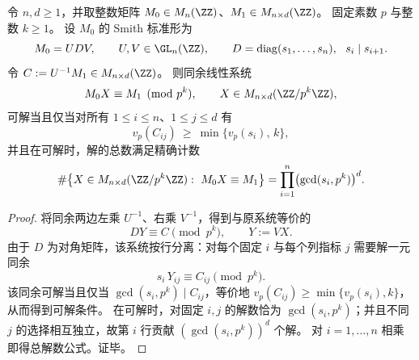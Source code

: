 





\begin{proposition}\label{prop:xi-smith-pk-congruence-solvability-count}
令 \(n,d\ge 1\)，并取整数矩阵 \(M_0\in M_n(\ZZ)\)、\(M_1\in M_{n\times d}(\ZZ)\)。
固定素数 \(p\) 与整数 \(k\ge 1\)。
设 \(M_0\) 的 Smith 标准形为
\[
M_0=UDV,\qquad U,V\in \GL_n(\ZZ),\qquad
D=\mathrm{diag}(s_1,\dots,s_n),\ \ s_i\mid s_{i+1}.
\]
令 \(C:=U^{-1}M_1\in M_{n\times d}(\ZZ)\)。
则同余线性系统
\[
M_0X\equiv M_1\pmod{p^k},\qquad X\in M_{n\times d}(\ZZ/p^k\ZZ),
\]
可解当且仅当对所有 \(1\le i\le n\)、\(1\le j\le d\) 有
\[
v_p(C_{ij})\ \ge\ \min\{v_p(s_i),\,k\},
\]
并且在可解时，解的总数满足精确计数
\[
\#\bigl\{X\in M_{n\times d}(\ZZ/p^k\ZZ):\ M_0X\equiv M_1\bigr\}
=\prod_{i=1}^{n}\bigl(\gcd(s_i,p^k)\bigr)^{d}.
\]
\end{proposition}
\begin{proof}
将同余两边左乘 \(U^{-1}\)、右乘 \(V^{-1}\)，得到与原系统等价的
\[
DY\equiv C\pmod{p^k},\qquad Y:=VX.
\]
由于 \(D\) 为对角矩阵，该系统按行分离：对每个固定 \(i\) 与每个列指标 \(j\) 需要解一元同余
\[
s_i\,Y_{ij}\equiv C_{ij}\pmod{p^k}.
\]
该同余可解当且仅当 \(\gcd(s_i,p^k)\mid C_{ij}\)，等价地 \(v_p(C_{ij})\ge \min\{v_p(s_i),k\}\)，从而得到可解条件。
在可解时，对固定 \(i,j\) 的解数恰为 \(\gcd(s_i,p^k)\)；并且不同 \(j\) 的选择相互独立，故第 \(i\) 行贡献 \((\gcd(s_i,p^k))^d\) 个解。
对 \(i=1,\dots,n\) 相乘即得总解数公式。证毕。
\end{proof}

